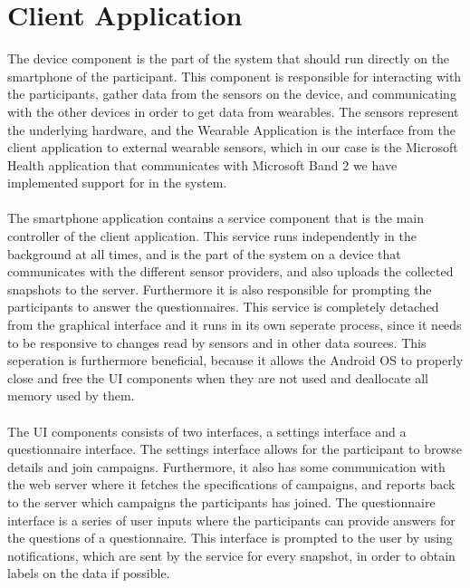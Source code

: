 
\section{Client Application}
\label{sec:client_application}

The device component is the part of the system that should run directly on the smartphone of the participant. This component is responsible for interacting with the participants, gather data from the sensors on the device, and communicating with the other devices in order to get data from wearables. The sensors represent the underlying hardware, and the Wearable Application is the interface from the client application to external wearable sensors, which in our case is the Microsoft Health application that communicates with Microsoft Band 2 we have implemented support for in the system.
\\\\
The smartphone application contains a service component that is the main controller of the client application. This service runs independently in the background at all times, and is the part of the system on a device that communicates with the different sensor providers, and also uploads the collected snapshots to the server. Furthermore it is also responsible for prompting the participants to answer the questionnaires. This service is completely detached from the graphical interface and it runs in its own seperate process, since it needs to be responsive to changes read by sensors and in other data sources. This seperation is furthermore beneficial, because it allows the Android OS to properly close and free the UI components when they are not used and deallocate all memory used by them. 
\\\\
The UI components consists of two interfaces, a settings interface and a questionnaire interface. The settings interface allows for the participant to browse details and join campaigns. Furthermore, it also has some communication with the web server where it fetches the specifications of campaigns, and reports back to the server which campaigns the participants has joined. The questionnaire interface is a series of user inputs where the participants can provide answers for the questions of a questionnaire. This interface is prompted to the user by using notifications, which are sent by the service for every snapshot, in order to obtain labels on the data if possible.
\\\\
